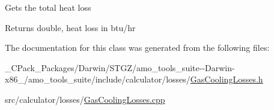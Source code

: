 Gets the total heat loss \begin{DoxyReturn}{Returns}
double, heat loss in btu/hr 
\end{DoxyReturn}


The documentation for this class was generated from the following files\+:\begin{DoxyCompactItemize}
\item 
\+\_\+\+C\+Pack\+\_\+\+Packages/\+Darwin/\+S\+T\+G\+Z/amo\+\_\+tools\+\_\+suite-\/-\/\+Darwin-\/x86\+\_/amo\+\_\+tools\+\_\+suite/include/calculator/losses/\hyperlink{___c_pack___packages_2_darwin_2_s_t_g_z_2amo__tools__suite--_darwin-x86__64_2amo__tools__suite_2a205f1c3faea20d1b572055736aa9a09}{Gas\+Cooling\+Losses.\+h}\item 
src/calculator/losses/\hyperlink{_gas_cooling_losses_8cpp}{Gas\+Cooling\+Losses.\+cpp}\end{DoxyCompactItemize}
